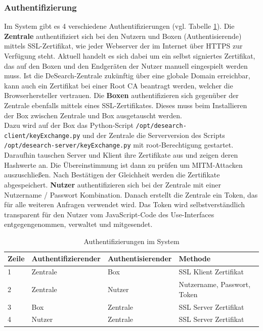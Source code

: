 \subsubsection{Authentifizierung} \label{cap:authentifizierung}
Im System gibt es 4 verschiedene Authentifizierungen (vgl. Tabelle \ref{tab:authentifizierungen}).\newline
Die \textbf{Zentrale} authentifiziert sich bei den Nutzern und Boxen (Authentisierende) mittels SSL-Zertifikat, wie jeder Webserver der im Internet über HTTPS zur Verfügung steht. Aktuell handelt es sich dabei um ein selbst signiertes Zertifikat, das auf den Boxen und den Endgeräten der Nutzer manuell eingespielt werden muss. Ist die DeSearch-Zentrale zukünftig über eine globale Domain erreichbar, kann auch ein Zertifikat bei einer Root CA beantragt werden, welcher die Browserhersteller vertrauen. \newline
Die \textbf{Boxen} authentifizieren sich gegenüber der Zentrale ebenfalls mittels eines SSL-Zertifikates.
Dieses muss beim Installieren der Box zwischen Zentrale und Box ausgetauscht werden. \\Dazu wird auf der Box das Python-Script \texttt{/opt/desearch-client/keyExchange.py} und der Zentrale die Serverversion des Scripts \texttt{/opt/desearch-server/keyExchange.py} mit root-Berechtigung gestartet. Daraufhin tauschen Server und Klient ihre Zertifikate aus und zeigen deren Hashwerte an. Die Übereinstimmung ist dann zu prüfen um MITM-Attacken auszuschließen. Nach Bestätigen der Gleichheit werden die Zertifikate abgespeichert. \newline
\textbf{Nutzer} authentifizieren sich bei der Zentrale mit einer Nutzername / Passwort Kombination. Danach erstellt die Zentrale ein Token, das für alle weiteren Anfragen verwendet wird. Das Token wird selbstverständlich transparent für den Nutzer vom JavaScript-Code des Use-Interfaces entgegengenommen, verwaltet und mitgesendet.

\begin{table}[h]
	\begin{tabular}{ | l | l | l | l |}
		\hline
		\textbf{Zeile} & \textbf{Authentifizierender} & \textbf{Authentisierender} &  \textbf{Methode} \\ \hline
		1 & Zentrale & Box      & SSL Klient Zertifikat \\ \hline
		2 & Zentrale & Nutzer   & Nutzername, Passwort, Token \\ \hline
		3 & Box      & Zentrale & SSL Server Zertifikat \\ \hline
		4 & Nutzer   & Zentrale & SSL Server Zertifikat \\ \hline
		
	\end{tabular}
	\caption{Authentifizierungen im System}
	\label{tab:authentifizierungen}
\end{table}

